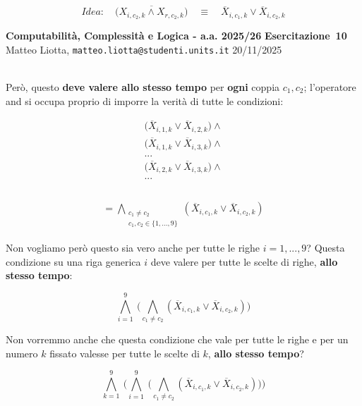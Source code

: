 \documentclass[a4paper,10pt]{article}
\makeatletter
\newcommand{\EsercitazioneNum}{10}
\newcommand{\Data}{20/11/2025}
\newcommand{\DocType}{Esercitazione} %
\newcommand{\FullTitle}{\DocType\ \EsercitazioneNum}
\newcommand{\Header}{
\noindent
  \small \textbf{Computabilità, Complessità e Logica - a.a. 2025/26} \hfill \textbf{\FullTitle} \\[0.2cm]
  \scriptsize Matteo Liotta, \texttt{matteo.liotta@studenti.units.it} \hfill \Data \\[0.2cm]
  \noindent\makebox[\linewidth]{\rule{\linewidth}{0.4pt}} \\[0.3cm]}
\newcommand{\NewPageHeader}{
  \vfill
  \noindent\makebox[\linewidth]{\rule{\linewidth}{0.4pt}}
  \newpage
  {\Header}
}
\makeatother
\begin{document}
{\begin{itemize}[label=, leftmargin=0pt]
\begin{osservazioni}
    $$Idea: \quad \overline{\bigg(X_{i,c_2,k}\land X_{r,c_2,k}\bigg)} \quad \equiv \quad \overline X_{i,c_1,k} \lor \overline X_{i,c_2,k} $$

\end{osservazioni}
\NewPageHeader
\begin{osservazioni} 

    Però, questo \textbf{deve valere allo stesso tempo} per \textbf{ogni} coppia $c_1,c_2$; l'operatore and si occupa proprio di imporre la verità di tutte le condizioni:
         



    $$\begin{array}{c}
         \bigg(\overline X_{i,1,k} \lor \overline X_{i,2,k}\bigg) \land \\
         \bigg(\overline X_{i,1,k} \lor \overline X_{i,3,k}\bigg) \land \\
         ... \\
         \bigg(\overline X_{i,2,k} \lor \overline X_{i,3,k}\bigg) \land \\
         ...  \\ 
         \\
    \end{array}$$
    
    $$\begin{array}{c}
    = \bigwedge\limits_{\begin{array}{c}
         c_1\ne c_2  \\
         c_1,c_2 \in \{1,...,9\}
    \end{array}} (\overline X_{i,c_1,k} \lor \overline X_{i,c_2,k})
    \end{array}$$

    Non vogliamo però questo sia vero anche per tutte le righe $i=1,...,9$? Questa condizione su una riga generica $i$ deve valere per tutte le scelte di righe,\textbf{ allo stesso tempo}:

             $$\bigwedge\limits_{i=1}^{9}\ \bigg( 
    \bigwedge\limits_{c_1\ne c_2} (\overline X_{i,c_1,k} \lor \overline X_{i,c_2,k})
    \bigg)$$


    Non vorremmo anche che questa condizione che vale per tutte le righe e per un numero $k$ fissato valesse per tutte le scelte di $k$, \textbf{allo stesso tempo}?

    $$\bigwedge\limits_{k=1}^{9}\ \bigg(\bigwedge\limits_{i=1}^{9}\ \bigg( \bigwedge\limits_{c_1\ne c_2} (\overline X_{i,c_1,k} \lor \overline X_{i,c_2,k})
    \bigg)\bigg)$$


\end{osservazioni}
\end{itemize}}
\end{document}
